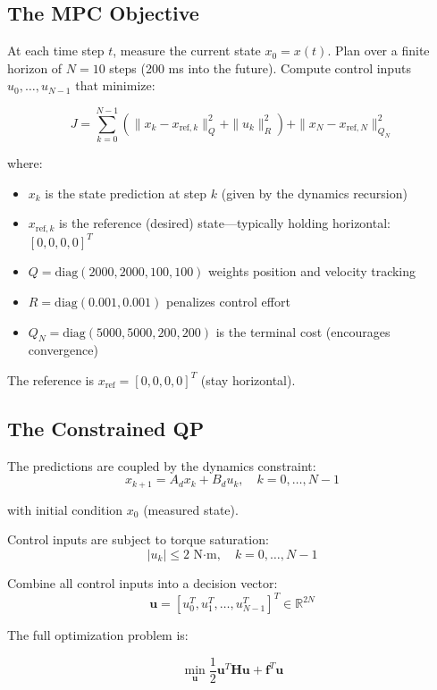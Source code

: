 \label{sec:mpc-formulation}

\subsection{The MPC Objective}

At each time step $t$, measure the current state $x_0 = x(t)$. Plan over a finite horizon of $N = 10$ steps (200 ms into the future). Compute control inputs $u_0, \ldots, u_{N-1}$ that minimize:

\[
J = \sum_{k=0}^{N-1} \left( \|x_k - x_{\text{ref},k}\|_Q^2 + \|u_k\|_R^2 \right) + \|x_N - x_{\text{ref},N}\|_{Q_N}^2
\]

where:
\begin{itemize}
\item $x_k$ is the state prediction at step $k$ (given by the dynamics recursion)
\item $x_{\text{ref},k}$ is the reference (desired) state---typically holding horizontal: $[0, 0, 0, 0]^T$
\item $Q = \text{diag}(2000, 2000, 100, 100)$ weights position and velocity tracking
\item $R = \text{diag}(0.001, 0.001)$ penalizes control effort
\item $Q_N = \text{diag}(5000, 5000, 200, 200)$ is the terminal cost (encourages convergence)
\end{itemize}

The reference is $x_{\text{ref}} = [0, 0, 0, 0]^T$ (stay horizontal).

\subsection{The Constrained QP}

The predictions are coupled by the dynamics constraint:
\[
x_{k+1} = A_d x_k + B_d u_k, \quad k = 0, \ldots, N-1
\]

with initial condition $x_0$ (measured state).

Control inputs are subject to torque saturation:
\[
|u_k| \leq 2 \text{ N·m}, \quad k = 0, \ldots, N-1
\]

Combine all control inputs into a decision vector:
\[
\mathbf{u} = [u_0^T, u_1^T, \ldots, u_{N-1}^T]^T \in \mathbb{R}^{2N}
\]

The full optimization problem is:

\[
\min_{\mathbf{u}} \frac{1}{2} \mathbf{u}^T \mathbf{H} \mathbf{u} + \mathbf{f}^T \mathbf{u}
\]

